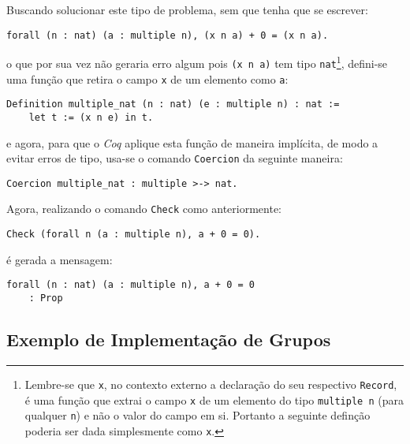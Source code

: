 Buscando solucionar este tipo de problema, sem que tenha que se escrever:
    \begin{lstlisting}[language = coq,frame=single,tabsize=1]
forall (n : nat) (a : multiple n), (x n a) + 0 = (x n a).
    \end{lstlisting}
o que por sua vez não geraria erro algum pois \lstinline[language = coq]$(x n a)$ tem tipo \lstinline[language = coq]$nat$\footnote{Lembre-se que \lstinline[language = coq]$x$, no contexto externo a declaração do seu respectivo \lstinline[language = coq]$Record$, é uma função que extrai o campo \lstinline[language = coq]$x$ de um elemento do tipo \lstinline[language = coq]$multiple n$ (para qualquer \lstinline[language = coq]$n$) e não o valor do campo em si. Portanto a seguinte definção poderia ser dada simplesmente como \lstinline[language = coq]$x$.}, defini-se uma função que retira o campo \lstinline[language = coq]$x$ de um elemento como \lstinline[language = coq]$a$:
    \begin{lstlisting}[language = coq,frame=single,tabsize=1]
Definition multiple_nat (n : nat) (e : multiple n) : nat :=
    let t := (x n e) in t.
    \end{lstlisting}
e agora, para que o \textit{Coq} aplique esta função de maneira implícita, de modo a evitar erros de tipo, usa-se o comando \lstinline[language = coq]$Coercion$ da seguinte maneira:
    \begin{lstlisting}[language = coq,frame=single,tabsize=1]
Coercion multiple_nat : multiple >-> nat.
    \end{lstlisting}
Agora, realizando o comando \lstinline[language = coq]$Check$ como anteriormente:
    \begin{lstlisting}[language = coq,frame=single,tabsize=1]
Check (forall n (a : multiple n), a + 0 = 0).
    \end{lstlisting}
é gerada a mensagem:
    \begin{lstlisting}[language = coq-error,frame=single,tabsize=1]
forall (n : nat) (a : multiple n), a + 0 = 0
    : Prop
    \end{lstlisting}

\subsection{Exemplo de Implementação de Grupos}
\label{sub:grupos}

